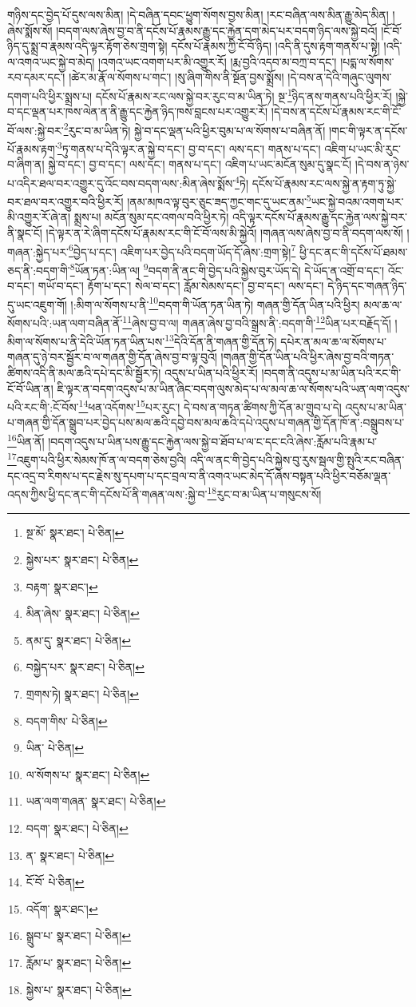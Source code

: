 གཉིས་དང་བྱེད་པོ་དུས་ལས་མིན། །དེ་བཞིན་དབང་ཕྱུག་སོགས་བྱས་མིན། །རང་བཞིན་ལས་མིན་རྒྱུ་མེད་མིན། །ཞེས་སྨོས་སོ། །བདག་ལས་ཞེས་བྱ་བ་ནི་དངོས་པོ་རྣམས་རྒྱུ་དང་རྐྱེན་དག་མེད་པར་བདག་ཉིད་ལས་སྐྱེ་བའོ། །ངོ་བོ་ཉིད་དུ་སྨྲ་བ་རྣམས་འདི་ལྟར་རྟོག་ཅེས་གྲག་སྟེ། དངོས་པོ་རྣམས་ཀྱི་ངོ་བོ་ཉིད། །འདི་ནི་དུས་རྟག་གནས་པ་སྟེ། །འདི་ལ་འགའ་ཡང་སྐྱེ་བ་མེད། །འགའ་ཡང་འགག་པར་མི་འགྱུར་རོ། །རྨ་བྱའི་འདབ་མ་བཀྲ་བ་དང་། །པདྨ་ལ་སོགས་རབ་དམར་དང་། །ཚེར་མ་རྣོ་ལ་སོགས་པ་གང་། །སུ་ཞིག་གིས་ནི་སྔོན་བྱས་སྨྲོས། །དེ་བས་ན་དེའི་གཞུང་ལུགས་དགག་པའི་ཕྱིར་སྨྲས་པ། དངོས་པོ་རྣམས་རང་ལས་སྐྱེ་བར་རུང་བ་མ་ཡིན་ཏེ། སྔ་\footnote{སྔ་མོ་  སྣར་ཐང་།  པེ་ཅིན། }ཉིད་ནས་གནས་པའི་ཕྱིར་རོ། །སྐྱེ་བ་དང་ལྡན་པར་ཁས་ལེན་ན་ནི་རྒྱུ་དང་རྐྱེན་ཉིད་ཁས་བླངས་པར་འགྱུར་རོ། །དེ་བས་ན་དངོས་པོ་རྣམས་རང་གི་ངོ་བོ་ལས་:སྐྱེ་བར་\footnote{སྐྱེས་པར་  སྣར་ཐང་།  པེ་ཅིན། }རུང་བ་མ་ཡིན་ཏེ། སྐྱེ་བ་དང་ལྡན་པའི་ཕྱིར་བུམ་པ་ལ་སོགས་པ་བཞིན་ནོ། །གང་གི་ལྟར་ན་དངོས་པོ་རྣམས་རྟག་\footnote{བརྟག་  སྣར་ཐང་། }ཏུ་གནས་པ་དེའི་ལྟར་ན་སྐྱེ་བ་དང་། བྱ་བ་དང་། ལས་དང་། གནས་པ་དང་། འཇིག་པ་ཡང་མི་རུང་བ་ཞིག་ན། སྐྱེ་བ་དང་། བྱ་བ་དང་། ལས་དང་། གནས་པ་དང་། འཇིག་པ་ཡང་མངོན་སུམ་དུ་སྣང་ངོ། །དེ་བས་ན་ཉེས་པ་འདིར་ཐལ་བར་འགྱུར་དུ་འོང་བས་བདག་ལས་:མིན་ཞེས་སྨོས་\footnote{མིན་ཞེས་  སྣར་ཐང་།  པེ་ཅིན། }ཏེ། དངོས་པོ་རྣམས་རང་ལས་སྐྱེ་ན་རྟག་ཏུ་སྐྱེ་བར་ཐལ་བར་འགྱུར་བའི་ཕྱིར་རོ། །ནམ་མཁའ་ལྟ་བུར་ཅུང་ཟད་ཀྱང་གང་དུ་ཡང་ནམ་\footnote{ནམ་དུ་  སྣར་ཐང་།  པེ་ཅིན། }ཡང་སྐྱེ་བའམ་འགག་པར་མི་འགྱུར་རོ་ཞེ་ན། སྨྲས་པ། མངོན་སུམ་དང་འགལ་བའི་ཕྱིར་ཏེ། འདི་ལྟར་དངོས་པོ་རྣམས་རྒྱུ་དང་རྐྱེན་ལས་སྐྱེ་བར་ནི་སྣང་ངོ། །དེ་ལྟར་ན་རེ་ཞིག་དངོས་པོ་རྣམས་རང་གི་ངོ་བོ་ལས་མི་སྐྱེའོ། །གཞན་ལས་ཞེས་བྱ་བ་ནི་བདག་ལས་སོ། །གཞན་:སྐྱེད་པར་\footnote{བསྐྱེད་པར་  སྣར་ཐང་།  པེ་ཅིན། }བྱེད་པ་དང་། འཇིག་པར་བྱེད་པའི་བདག་ཡོད་དོ་ཞེས་:གྲག་སྟེ།\footnote{གྲགས་ཏེ།  སྣར་ཐང་།  པེ་ཅིན། } ཕྱི་དང་ནང་གི་དངོས་པོ་ཐམས་ཅད་ནི་:བདག་གི་\footnote{བདག་གིས་  པེ་ཅིན། }ཡོན་ཏན་:ཡིན་ལ། \footnote{ཡིན་  པེ་ཅིན། }བདག་ནི་ནང་གི་བྱེད་པའི་སྐྱེས་བུར་ཡོད་དེ། དེ་ཡོད་ན་འགྲོ་བ་དང་། འོང་བ་དང་། གཡོ་བ་དང་། རྟོག་པ་དང་། སེལ་བ་དང་། རློམ་སེམས་དང་། བྱ་བ་དང་། ལས་དང་། དེ་ཉིད་དང་གཞན་ཉིད་དུ་ཡང་འཇུག་གོ། །:མིག་ལ་སོགས་པ་ནི་\footnote{ལ་སོགས་པ་  སྣར་ཐང་།  པེ་ཅིན། }བདག་གི་ཡོན་ཏན་ཡིན་ཏེ། གཞན་གྱི་དོན་ཡིན་པའི་ཕྱིར། མལ་ཆ་ལ་སོགས་པའི་:ཡན་ལག་བཞིན་ནོ་\footnote{ཡན་ལག་གཞན་  སྣར་ཐང་།  པེ་ཅིན། }ཞེས་བྱ་བ་ལ། གཞན་ཞེས་བྱ་བའི་སྒྲས་ནི་:བདག་གི་\footnote{བདག་  སྣར་ཐང་།  པེ་ཅིན། }ཡིན་པར་བརྗོད་དོ། །མིག་ལ་སོགས་པ་ནི་དེའི་ཡོན་ཏན་ཡིན་པས་\footnote{ན་  སྣར་ཐང་།  པེ་ཅིན། }དེའི་དོན་ནི་གཞན་གྱི་དོན་ཏེ། དཔེར་ན་མལ་ཆ་ལ་སོགས་པ་གཞན་དུ་ཉེ་བར་སྦྱོར་བ་ལ་གཞན་གྱི་དོན་ཞེས་བྱ་བ་ལྟ་བུའོ། །གཞན་གྱི་དོན་ཡིན་པའི་ཕྱིར་ཞེས་བྱ་བའི་གཏན་ཚིགས་འདི་ནི་མལ་ཆའི་དཔེ་དང་མི་སྦྱོར་ཏེ། འདུས་པ་ཡིན་པའི་ཕྱིར་རོ། །བདག་ནི་འདུས་པ་མ་ཡིན་པའི་རང་གི་ངོ་བོ་ཡིན་ན། ཇི་ལྟར་ན་བདག་འདུས་པ་མ་ཡིན་ཞིང་བདག་ལུས་མེད་པ་ལ་མལ་ཆ་ལ་སོགས་པའི་ཡན་ལག་འདུས་པའི་རང་གི་:ངོ་བོས་\footnote{ངོ་བོ་  པེ་ཅིན། }ཕན་འདོགས་\footnote{འདོག་  སྣར་ཐང་། }པར་རུང་། དེ་བས་ན་གཏན་ཚིགས་ཀྱི་དོན་མ་གྲུབ་པ་དེ། འདུས་པ་མ་ཡིན་པ་གཞན་གྱི་དོན་སྒྲུབ་པར་བྱེད་པས་མལ་ཆའི་དབྱེ་བས་མལ་ཆའི་དཔེ་འདུས་པ་གཞན་གྱི་དོན་ཁོ་ན་:བསྒྲུབས་པ་\footnote{སྒྲུབ་པ་  སྣར་ཐང་།  པེ་ཅིན། }ཡིན་ནོ། །བདག་འདུས་པ་ཡིན་པས་རྒྱུ་དང་རྐྱེན་ལས་སྐྱེ་བ་ཐོབ་པ་ལ་ང་དང་ངའི་ཞེས་:རློམ་པའི་རྣམ་པ་\footnote{རློམ་པ་  སྣར་ཐང་།  པེ་ཅིན། }འཇུག་པའི་ཕྱིར་སེམས་ཁོ་ན་ལ་བདག་ཅེས་བྱའི། འདི་ལ་ནང་གི་བྱེད་པའི་སྐྱེས་བུ་རུས་སྦལ་གྱི་སྤུའི་རང་བཞིན་དང་འདྲ་བ་རིགས་པ་དང་རྗེས་སུ་དཔག་པ་དང་བྲལ་བ་ནི་འགའ་ཡང་མེད་དོ་ཞེས་བསྟན་པའི་ཕྱིར་བཅོམ་ལྡན་འདས་ཀྱིས་ཕྱི་དང་ནང་གི་དངོས་པོ་ནི་གཞན་ལས་:སྐྱེ་བ་\footnote{སྐྱེས་པ་  སྣར་ཐང་།  པེ་ཅིན། }རུང་བ་མ་ཡིན་པ་གསུངས་སོ། 